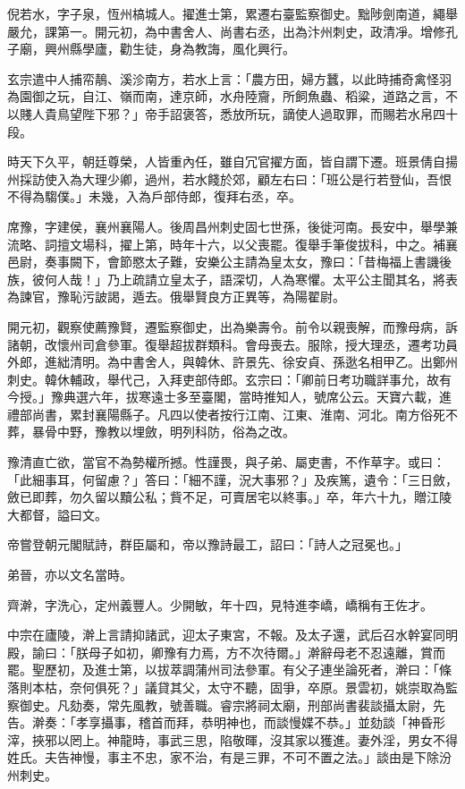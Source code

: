\begin{pinyinscope}
 倪若水，字子泉，恆州槁城人。擢進士第，累遷右臺監察御史。黜陟劍南道，繩舉嚴允，課第一。開元初，為中書舍人、尚書右丞，出為汴州刺史，政清凈。增修孔子廟，興州縣學廬，勸生徒，身為教誨，風化興行。



 玄宗遣中人捕帟鶄、溪沴南方，若水上言：「農方田，婦方蠶，以此時捕奇禽怪羽為園御之玩，自江、嶺而南，達京師，水舟陸齎，所飼魚蟲、稻粱，道路之言，不以賤人貴鳥望陛下邪？」帝手詔褒答，悉放所玩，謫使人過取罪，而賜若水帛四十段。



 時天下久平，朝廷尊榮，人皆重內任，雖自冗官擢方面，皆自謂下遷。班景倩自揚州採訪使入為大理少卿，過州，若水餞於郊，顧左右曰：「班公是行若登仙，吾恨不得為騶僕。」未幾，入為戶部侍郎，復拜右丞，卒。



 席豫，字建侯，襄州襄陽人。後周昌州刺史固七世孫，後徙河南。長安中，舉學兼流略、詞擅文場科，擢上第，時年十六，以父喪罷。復舉手筆俊拔科，中之。補襄邑尉，奏事闕下，會節愍太子難，安樂公主請為皇太女，豫曰：「昔梅福上書譏後族，彼何人哉！」乃上疏請立皇太子，語深切，人為寒懼。太平公主聞其名，將表為諫官，豫恥污詖謁，遁去。俄舉賢良方正異等，為陽翟尉。



 開元初，觀察使薦豫賢，遷監察御史，出為樂壽令。前令以親喪解，而豫母病，訴諸朝，改懷州司倉參軍。復舉超拔群類科。會母喪去。服除，授大理丞，遷考功員外郎，進絀清明。為中書舍人，與韓休、許景先、徐安貞、孫逖名相甲乙。出鄭州刺史。韓休輔政，舉代己，入拜吏部侍郎。玄宗曰：「卿前日考功職詳事允，故有今授。」豫典選六年，拔寒遠士多至臺閣，當時推知人，號席公云。天寶六載，進禮部尚書，累封襄陽縣子。凡四以使者按行江南、江東、淮南、河北。南方俗死不葬，暴骨中野，豫教以埋斂，明列科防，俗為之改。



 豫清直亡欲，當官不為勢權所撼。性謹畏，與子弟、屬吏書，不作草字。或曰：「此細事耳，何留慮？」答曰：「細不謹，況大事邪？」及疾篤，遺令：「三日斂，斂已即葬，勿久留以黷公私；貲不足，可賣居宅以終事。」卒，年六十九，贈江陵大都督，謚曰文。



 帝嘗登朝元閣賦詩，群臣屬和，帝以豫詩最工，詔曰：「詩人之冠冕也。」



 弟晉，亦以文名當時。



 齊澣，字洗心，定州義豐人。少開敏，年十四，見特進李嶠，嶠稱有王佐才。



 中宗在廬陵，澣上言請抑諸武，迎太子東宮，不報。及太子還，武后召水幹宴同明殿，諭曰：「朕母子如初，卿豫有力焉，方不次待爾。」澣辭母老不忍遠離，賞而罷。聖歷初，及進士第，以拔萃調蒲州司法參軍。有父子連坐論死者，澣曰：「條落則本枯，奈何俱死？」議貸其父，太守不聽，固爭，卒原。景雲初，姚崇取為監察御史。凡劾奏，常先風教，號善職。睿宗將祠太廟，刑部尚書裴談攝太尉，先告。澣奏：「孝享攝事，稽首而拜，恭明神也，而談慢媟不恭。」並劾談「神昏形滓，挾邪以罔上。神龍時，事武三思，陷敬暉，沒其家以獲進。妻外淫，男女不得姓氏。夫告神慢，事主不忠，家不治，有是三罪，不可不置之法。」談由是下除汾州刺史。




\end{pinyinscope}
